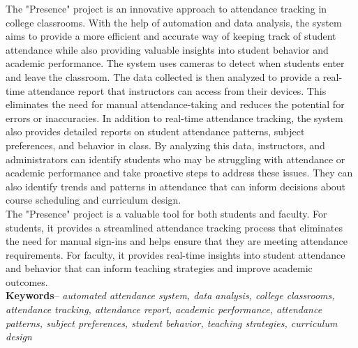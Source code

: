 The "Presence" project is an innovative approach to attendance tracking in college classrooms. With the help of automation and data analysis, the system aims to provide a more efficient and accurate way of keeping track of student attendance while also providing valuable insights into student behavior and academic performance. The system uses cameras to detect when students enter and leave the classroom. The data collected is then analyzed to provide a real-time attendance report that instructors can access from their devices. This eliminates the need for manual attendance-taking and reduces the potential for errors or inaccuracies. In addition to real-time attendance tracking, the system also provides detailed reports on student attendance patterns, subject preferences, and behavior in class. By analyzing this data, instructors, and administrators can identify students who may be struggling with attendance or academic performance and take proactive steps to address these issues. They can also identify trends and patterns in attendance that can inform decisions about course scheduling and curriculum design.\\

The "Presence" project is a valuable tool for both students and faculty. For students, it provides a streamlined attendance tracking process that eliminates the need for manual sign-ins and helps ensure that they are meeting attendance requirements. For faculty, it provides real-time insights into student attendance and behavior that can inform teaching strategies and improve academic outcomes.\\ 

\textbf{Keywords}--
\textit{ automated attendance system, data analysis, college classrooms, attendance tracking, attendance report, academic performance, attendance patterns, subject preferences, student behavior, teaching strategies, curriculum design }